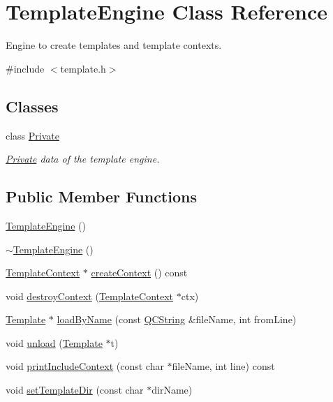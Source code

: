 \hypertarget{class_template_engine}{}\section{Template\+Engine Class Reference}
\label{class_template_engine}


Engine to create templates and template contexts.  




{\ttfamily \#include $<$template.\+h$>$}

\subsection*{Classes}
\begin{DoxyCompactItemize}
\item 
class \mbox{\hyperlink{class_template_engine_1_1_private}{Private}}
\begin{DoxyCompactList}\small\item\em \mbox{\hyperlink{class_template_engine_1_1_private}{Private}} data of the template engine. \end{DoxyCompactList}\end{DoxyCompactItemize}
\subsection*{Public Member Functions}
\begin{DoxyCompactItemize}
\item 
\mbox{\hyperlink{class_template_engine_ad12f5d696ed3fc82fd729e1b6892d328}{Template\+Engine}} ()
\item 
\mbox{\hyperlink{class_template_engine_a8648e1b96a8c4bff1fe1b2c38a84948b}{$\sim$\+Template\+Engine}} ()
\item 
\mbox{\hyperlink{class_template_context}{Template\+Context}} $\ast$ \mbox{\hyperlink{class_template_engine_a2c0d83df212c210406dc78f74fe3f2ad}{create\+Context}} () const
\item 
void \mbox{\hyperlink{class_template_engine_ae3bbdafa4c8c0c912f64300643d0b37f}{destroy\+Context}} (\mbox{\hyperlink{class_template_context}{Template\+Context}} $\ast$ctx)
\item 
\mbox{\hyperlink{class_template}{Template}} $\ast$ \mbox{\hyperlink{class_template_engine_a518bcc65a14287f897eebad289ecdd11}{load\+By\+Name}} (const \mbox{\hyperlink{class_q_c_string}{Q\+C\+String}} \&file\+Name, int from\+Line)
\item 
void \mbox{\hyperlink{class_template_engine_a6050af3395989e4521969369ea7c2de0}{unload}} (\mbox{\hyperlink{class_template}{Template}} $\ast$t)
\item 
void \mbox{\hyperlink{class_template_engine_a01fc4ed6843913d0dd24023507cfbe4d}{print\+Include\+Context}} (const char $\ast$file\+Name, int line) const
\item 
void \mbox{\hyperlink{class_template_engine_aa08aa86e5d68d0914fc167dabb4d46e5}{set\+Template\+Dir}} (const char $\ast$dir\+Name)
\end{DoxyCompactItemize}
